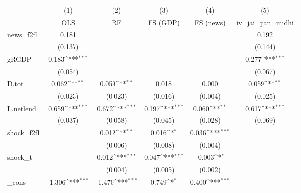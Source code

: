 {
\def\sym#1{\ifmmode^{#1}\else\(^{#1}\)\fi}
\begin{tabular}{l*{5}{c}}
\toprule
            &\multicolumn{1}{c}{(1)}&\multicolumn{1}{c}{(2)}&\multicolumn{1}{c}{(3)}&\multicolumn{1}{c}{(4)}&\multicolumn{1}{c}{(5)}\\
            &\multicolumn{1}{c}{OLS}&\multicolumn{1}{c}{RF}&\multicolumn{1}{c}{FS (GDP)}&\multicolumn{1}{c}{FS (news)}&\multicolumn{1}{c}{iv\_jai\_pan\_midhi}\\
\midrule
news\_f2f1   &       0.181         &                     &                     &                     &       0.192         \\
            &     (0.137)         &                     &                     &                     &     (0.144)         \\
\addlinespace
gRGDP       &       0.183\sym{***}&                     &                     &                     &       0.277\sym{***}\\
            &     (0.054)         &                     &                     &                     &     (0.067)         \\
\addlinespace
D.tot       &       0.062\sym{**} &       0.059\sym{**} &       0.018         &       0.000         &       0.059\sym{**} \\
            &     (0.023)         &     (0.023)         &     (0.016)         &     (0.004)         &     (0.025)         \\
\addlinespace
L.netlend   &       0.659\sym{***}&       0.672\sym{***}&       0.197\sym{***}&       0.060\sym{**} &       0.617\sym{***}\\
            &     (0.037)         &     (0.058)         &     (0.045)         &     (0.028)         &     (0.069)         \\
\addlinespace
shock\_f2f1  &                     &       0.012\sym{**} &       0.016\sym{*}  &       0.036\sym{***}&                     \\
            &                     &     (0.006)         &     (0.008)         &     (0.004)         &                     \\
\addlinespace
shock\_t     &                     &       0.012\sym{***}&       0.047\sym{***}&      -0.003\sym{*}  &                     \\
            &                     &     (0.004)         &     (0.005)         &     (0.002)         &                     \\
\addlinespace
\_cons      &      -1.306\sym{***}&      -1.470\sym{***}&       0.749\sym{*}  &       0.400\sym{***}&                     \\

\end{tabular}}
